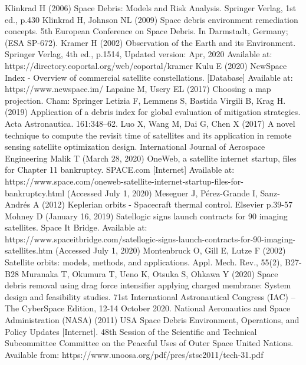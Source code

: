 \documentclass[12pt,a4paper,notitlepage,twoside,openright]{report}
\begin{document}
\begin{thebibliography}{100}
 Klinkrad H (2006) Space Debris: Models and Risk Analysis. Springer Verlag, 1st ed., p.430
 Klinkrad H, Johnson NL (2009) Space debris environment remediation concepts. 5th European Conference on Space Debris. In Darmstadt, Germany; (ESA SP-672). 
 Kramer H (2002) Observation of the Earth and its Environment. Springer Verlag, 4th ed., p.1514, Updated version: Apr, 2020 Available at: https://directory.eoportal.org/web/eoportal/kramer
 Kulu E (2020) NewSpace Index - Overview of commercial satellite constellations. [Database] Available at: https://www.newspace.im/
 Lapaine M, Usery EL (2017) Choosing a map projection. Cham: Springer
 Letizia F, Lemmens S, Bastida Virgili B, Krag H. (2019) Application of a debris index for global evaluation of mitigation strategies. Acta Astronautica. 161:348–62.
 Luo X, Wang M, Dai G, Chen X (2017) A novel technique to compute the revisit time of satellites and its application in remote sensing satellite optimization design. International Journal of Aerospace Engineering
 Malik T (March 28, 2020) OneWeb, a satellite internet startup, files for Chapter 11 bankruptcy. SPACE.com [Internet] Available at: https://www.space.com/oneweb-satellite-internet-startup-files-for-bankruptcy.html (Accessed July 1, 2020)
 Meseguer J, Pérez-Grande I, Sanz-Andrés A (2012) Keplerian orbits - Spacecraft thermal control. Elsevier p.39-57
 Mohney D (January 16, 2019) Satellogic signs launch contracts for 90 imaging satellites. Space It Bridge. Available at: https://www.spaceitbridge.com/satellogic-signs-launch-contracts-for-90-imaging-satellites.htm (Accessed July 1, 2020)
 Montenbruck O, Gill E, Lutze F (2002) Satellite orbits: models, methods, and applications. Appl. Mech. Rev., 55(2), B27-B28
 Muranaka T, Okumura T, Ueno K, Otsuka S, Ohkawa Y (2020) Space debris removal using drag force intensifier applying charged membrane: System design and feasibility studies. 71st International Astronautical Congress (IAC) – The CyberSpace Edition, 12-14 October 2020. 
 National Aeronautics and Space Administration (NASA) (2011) USA Space Debris Environment, Operations, and Policy Updates [Internet]. 48th Session of the Scientific and Technical Subcommittee Committee on the Peaceful Uses of Outer Space United Nations. Available from: https://www.unoosa.org/pdf/pres/stsc2011/tech-31.pdf

\end{thebibliography}
\end{document}
